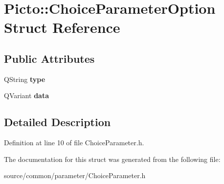 \hypertarget{struct_picto_1_1_choice_parameter_option}{\section{Picto\-:\-:Choice\-Parameter\-Option Struct Reference}
\label{struct_picto_1_1_choice_parameter_option}
}
\subsection*{Public Attributes}
\begin{DoxyCompactItemize}
\item 
\hypertarget{struct_picto_1_1_choice_parameter_option_a122cf4874a1ba0bbfa139ead00b05f60}{Q\-String {\bfseries type}}\label{struct_picto_1_1_choice_parameter_option_a122cf4874a1ba0bbfa139ead00b05f60}

\item 
\hypertarget{struct_picto_1_1_choice_parameter_option_ab0520fd6cc080a1d93ebd295426b7f39}{Q\-Variant {\bfseries data}}\label{struct_picto_1_1_choice_parameter_option_ab0520fd6cc080a1d93ebd295426b7f39}

\end{DoxyCompactItemize}


\subsection{Detailed Description}


Definition at line 10 of file Choice\-Parameter.\-h.



The documentation for this struct was generated from the following file\-:\begin{DoxyCompactItemize}
\item 
source/common/parameter/Choice\-Parameter.\-h\end{DoxyCompactItemize}
